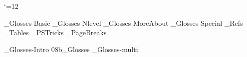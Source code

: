 




 \catcode`\@=12

%
%
%







%




_Glosses-Basic
_Glosses-Nlevel
_Glosses-MoreAbout
_Glosses-Special
_Refs
_Tables
_PSTricks
_PageBreaks
%

%
%
%
%
%
%
%
%
%

\bye
_Glosses-Intro
\get 08b_Glosses
_Glosses-multi

